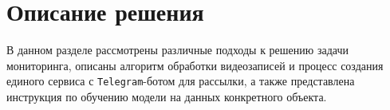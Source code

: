 
\section{Описание решения}

В данном разделе рассмотрены различные подходы к решению задачи мониторинга,
описаны алгоритм обработки видеозаписей и процесс создания единого сервиса с \texttt{Telegram}-ботом для рассылки,
а также представлена инструкция по обучению модели на данных конкретного объекта.





